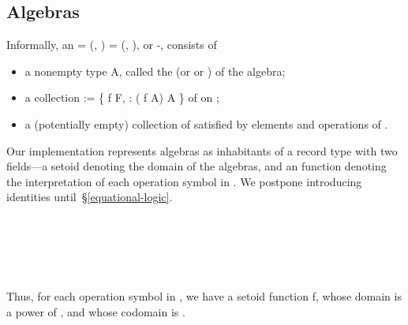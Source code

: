 \subsection{Algebras}\label{algebras}
Informally, an   = (, ) 
 = (, ), or -, consists of
\begin{itemize}
\item a nonempty type \ab A, called the  (or  or
) of the algebra;
\item a collection  :=
  \{   \ab f  \ab F,  \as :
    ( \ab f  \ab A)  \ab A \} of  on ;
\item a (potentially empty) collection of  satisfied by elements and
operations of .
\end{itemize}
Our \agda implementation represents algebras as inhabitants of a record type with two
fields---a  setoid denoting the domain of the algebras, and an  function denoting the interpretation of each operation symbol in . We postpone introducing identities until~§\ref{equational-logic}.

\begin{code}%
\>[0]\<%
\\
\>[0]\AgdaSpace{}%
\AgdaSpace{}%
\AgdaSpace{}%
\AgdaSpace{}%
\AgdaSymbol{:}\AgdaSpace{}%
\AgdaSpace{}%
\AgdaSymbol{(}\AgdaSpace{}%
\AgdaSpace{}%
\AgdaSpace{}%
\AgdaSpace{}%
\AgdaSpace{}%
\AgdaSymbol{(}\AgdaSpace{}%
\AgdaSpace{}%
\AgdaSymbol{))}\AgdaSpace{}%
\<%
\\
\>[0][@{}l@{\AgdaIndent{0}}]%
\>[1]%
\>[8]%
\>[16]\AgdaSymbol{:}\AgdaSpace{}%
\AgdaSpace{}%
\AgdaSpace{}%
\<%
\\
%
\>[8]%
\>[16]\AgdaSymbol{:}\AgdaSpace{}%
\AgdaSpace{}%
\AgdaSpace{}%
\AgdaSpace{}%
\AgdaSpace{}%
\AgdaSpace{}%
\<%
\\
\>[0]\<%
\end{code}
Thus, for each operation symbol in , we have a setoid function
\ab f, whose domain is a power of , and whose codomain is .

